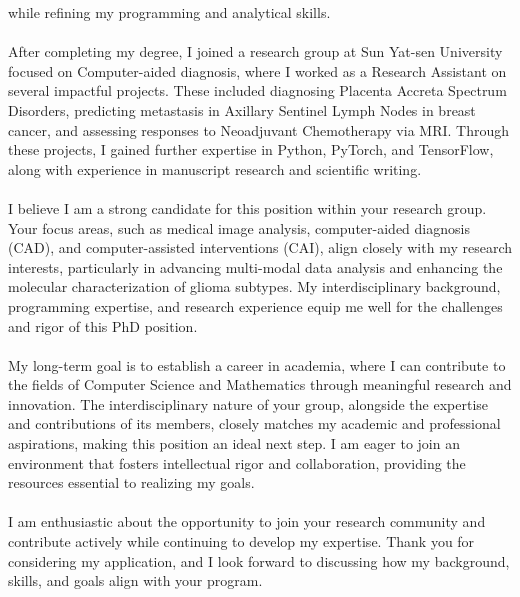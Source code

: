 \documentclass[11pt,a4paper, final]{moderncv}
\begin{document}
while refining my programming and analytical skills.
\ \\
\ \\
After completing my degree, 
I joined a research group at Sun Yat-sen University focused on Computer-aided diagnosis, 
where I worked as a Research Assistant on several impactful projects. 
These included diagnosing Placenta Accreta Spectrum Disorders, 
predicting metastasis in Axillary Sentinel Lymph Nodes in breast cancer, 
and assessing responses to Neoadjuvant Chemotherapy via MRI. 
Through these projects, I gained further expertise in Python, PyTorch, and TensorFlow, 
along with experience in manuscript research and scientific writing.
\ \\
\ \\
I believe I am a strong candidate for this position within your research group. 
Your focus areas, such as medical image analysis, computer-aided diagnosis (CAD), 
and computer-assisted interventions (CAI), align closely with my research interests, 
particularly in advancing multi-modal data analysis and enhancing the molecular characterization of glioma subtypes. 
My interdisciplinary background, programming expertise, 
and research experience equip me well for the challenges and rigor of this PhD position.
\ \\
\ \\
My long-term goal is to establish a career in academia, 
where I can contribute to the fields of Computer Science and Mathematics through meaningful research and innovation. 
The interdisciplinary nature of your group, alongside the expertise and contributions of its members, 
closely matches my academic and professional aspirations, making this position an ideal next step. 
I am eager to join an environment that fosters intellectual rigor and collaboration, 
providing the resources essential to realizing my goals.
\ \\
\ \\
I am enthusiastic about the opportunity to join your research community 
and contribute actively while continuing to develop my expertise. 
Thank you for considering my application, 
and I look forward to discussing how my background, skills, and goals align with your program.

\makeletterclosing
\end{document}
